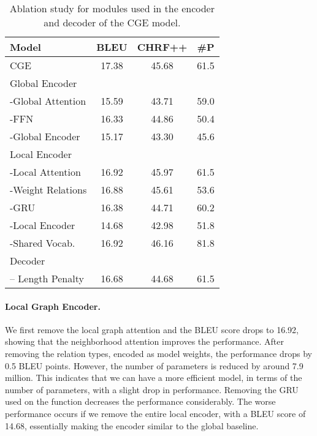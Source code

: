 \documentclass[11pt,a4paper]{article}
\begin{document}
\begin{table}[t]
\centering
{\renewcommand{\arraystretch}{0.8}
\setlength{\belowrulesep}{1.3pt}
\setlength{\aboverulesep}{0pt}
\begin{tabular}{@{\hspace*{1.8mm}}lccc@{\hspace*{1.8mm}}}  
\toprule
\textbf{Model} & \textbf{BLEU} & \textbf{CHRF++} &  \textbf{\#P}   \\
\midrule
CGE & 17.38 & 45.68 & 61.5 \\
\midrule
Global Encoder &  & &  \\
 -Global Attention & 15.59 & 43.71 & 59.0 \\
 -FFN & 16.33 & 44.86 & 50.4 \\
 -Global Encoder & 15.17 & 43.30 & 45.6 \\
\midrule
Local Encoder &  & &  \\
 -Local Attention & 16.92 & 45.97 & 61.5 \\
 -Weight Relations & 16.88 & 45.61 & 53.6 \\
 -GRU & 16.38 & 44.71 & 60.2 \\
 -Local Encoder & 14.68 & 42.98 & 51.8  \\
 \midrule
 -Shared Vocab. & 16.92 & 46.16 & 81.8 \\
\midrule
 Decoder &  & & \\
 -- Length Penalty & 16.68 & 44.68 & 61.5 \\
\bottomrule
\end{tabular}}
\caption{Ablation study for modules used in the encoder and decoder of the {\selectfont CGE} model.}
\label{tab:ablation}
\end{table}



\paragraph{Local Graph Encoder.} We first remove the local graph attention and the BLEU score drops to 16.92, showing that the neighborhood attention improves the performance. After removing the relation types, encoded as model weights, the performance drops by 0.5 BLEU points. However, the number of parameters is reduced by around 7.9 million. This indicates that we can have a more efficient model, in terms of the number of parameters, with a slight drop in performance. Removing the GRU used on the  function decreases the performance considerably. The worse performance occurs if we remove the entire local encoder, with a BLEU score of 14.68, essentially making the encoder similar to the global baseline.
\end{document}
